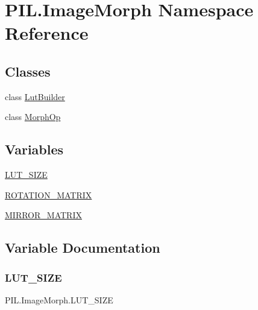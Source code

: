 \hypertarget{namespacePIL_1_1ImageMorph}{}\section{P\+I\+L.\+Image\+Morph Namespace Reference}
\label{namespacePIL_1_1ImageMorph}
\subsection*{Classes}
\begin{DoxyCompactItemize}
\item 
class \hyperlink{classPIL_1_1ImageMorph_1_1LutBuilder}{Lut\+Builder}
\item 
class \hyperlink{classPIL_1_1ImageMorph_1_1MorphOp}{Morph\+Op}
\end{DoxyCompactItemize}
\subsection*{Variables}
\begin{DoxyCompactItemize}
\item 
\hyperlink{namespacePIL_1_1ImageMorph_af2bfcb0204cde28e8a45aa8772eb6e31}{L\+U\+T\+\_\+\+S\+I\+ZE}
\item 
\hyperlink{namespacePIL_1_1ImageMorph_a6f6b30f045a98691faa9dbbbea5b74e7}{R\+O\+T\+A\+T\+I\+O\+N\+\_\+\+M\+A\+T\+R\+IX}
\item 
\hyperlink{namespacePIL_1_1ImageMorph_a11bb416fea732fe46a6a49d12576b990}{M\+I\+R\+R\+O\+R\+\_\+\+M\+A\+T\+R\+IX}
\end{DoxyCompactItemize}


\subsection{Variable Documentation}
\mbox{\label{namespacePIL_1_1ImageMorph_af2bfcb0204cde28e8a45aa8772eb6e31}} 
\subsubsection{\texorpdfstring{L\+U\+T\+\_\+\+S\+I\+ZE}{LUT\_SIZE}}
{\footnotesize\ttfamily P\+I\+L.\+Image\+Morph.\+L\+U\+T\+\_\+\+S\+I\+ZE}

